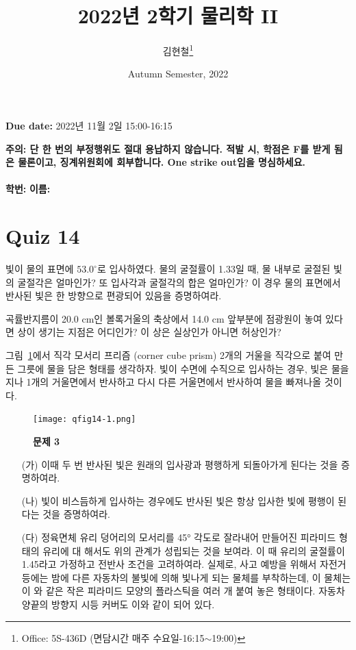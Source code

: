 \documentclass[tightenlines,floatfix,nofootinbib,superscriptaddress,fleqn]{revtex4}
\begin{document}
\title{\Large 2022년 2학기 물리학 II}
\author{김현철\footnote{Office: 5S-436D (면담시간 매주
    수요일-16:15$\sim$19:00)}} 
\date{Autumn Semester, 2022}

\maketitle

{\color{red} {\bf Due date:} 2022년 11월 2일  15:00-16:15 }
\vspace{1.cm}

\noindent \textbf{ 주의: \color{blue} 단 한 번의 부정행위도 절대
  용납하지 않습니다. 적발 시, 학점은 F를 받게 됨은 물론이고,
  징계위원회에 회부합니다. One strike out임을 명심하세요.} 
\\
\\

{\bf 학번:} \hspace{4cm}
{\bf 이름:} 

\section*{\large Quiz 14}
빛이 물의 표면에 $53.0^\circ$로 입사하였다. 물의 굴절률이 1.33일 때, 물
내부로 굴절된 빛의 굴절각은 얼마인가? 또 입사각과 굴절각의 합은
얼마인가? 이 경우 물의 표면에서 반사된 빛은 한 방향으로 편광되어
있음을 증명하여라. 
\newpage

곡률반지름이 20.0 cm인 볼록거울의 축상에서 14.0 cm 앞부분에 점광원이
놓여 있다면 상이 생기는 지점은 어디인가? 이 상은 실상인가 아니면 허상인가?
\newpage

그림~\ref{fig:1}에서 직각 모서리 프리즘 (corner cube prism) 2개의 거울을
직각으로 붙여 만든 그릇에 물을 담은 형태를 생각하자. 빛이 수면에
수직으로 입사하는 경우, 빛은 물을 지나 1개의 거울면에서 반사하고 다시
다른 거울면에서 반사하여 물을 빠져나올 것이다.
\begin{figure}[htp]
  \centering
  \texttt{[image: qfig14-1.png]}
  \caption{\textbf{문제 3}}
  \label{fig:1}
\end{figure}
\begin{itemize}
\item[(가)] 이때 두 번 반사된 빛은 원래의 입사광과 평행하게 되돌아가게
  된다는 것을 증명하여라.
\item[(나)] 빛이 비스듬하게 입사하는 경우에도 반사된 빛은 항상 입사한
  빛에 평행이 된다는 것을 증명하여라.
\item[(다)] 정육면체 유리 덩어리의 모서리를 45° 각도로 잘라내어
  만들어진 피라미드 형태의 유리에 대 해서도 위의 관계가 성립되는 것을
  보여라. 이 때 유리의 굴절률이 1.45라고 가정하고 전반사 조건을
  고려하여라. 실제로, 사고 예방을 위해서 자전거 등에는 밤에 다른
  자동차의 불빛에 의해 빛나게 되는 물체를 부착하는데, 이 물체는 이 와
  같은 작은 피라미드 모양의 플라스틱을 여러 개 붙여 놓은
  형태이다. 자동차 양끝의 방향지 시등 커버도 이와 같이 되어 있다.  
\end{itemize}
\newpage
\end{document}
